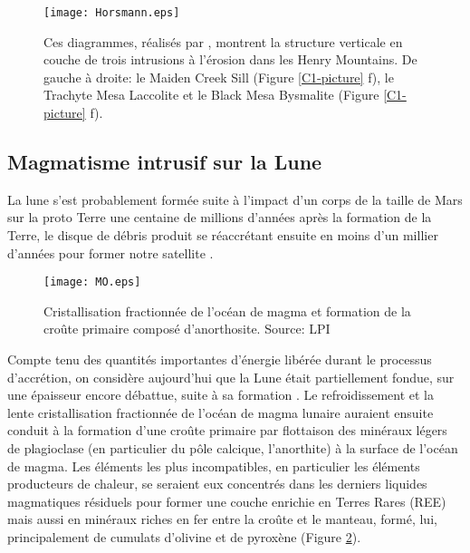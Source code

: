 \begin{figure}[htpb]
 \begin{center}
 \graphicspath{ {/Users/thorey/Documents/These/Manuscript/Figure/Chapter1/} }
 \texttt{[image: Horsmann.eps]}
 \caption{Ces diagrammes, réalisés par \citet{Horsman:2009gea},
 montrent la structure verticale en couche de trois intrusions à
 l'érosion dans les Henry Mountains. De gauche à droite: le
 Maiden Creek Sill (Figure \ref{C1-picture} f), le Trachyte Mesa
 Laccolite et le Black Mesa Bysmalite (Figure \ref{C1-picture}
 f).}
 \label{C1-Horsmann}
 \end{center}
\end{figure}

\subsection{Magmatisme intrusif sur la Lune}
\label{C1-sec:moon}

La lune s'est probablement formée suite à l'impact d'un corps de la
taille de Mars sur la proto Terre une centaine de millions d'années
après la formation de la Terre, le disque de débris produit se
réaccrétant ensuite en moins d'un millier d'années pour former notre
satellite
\citep{Mizutani:1972hc,Cameron:1991vu,Canup:2001eb,Canup:2012cd}.
\begin{figure}[h!]
 \begin{center}
 \graphicspath{ {/Users/thorey/Documents/These/Manuscript/Figure/Chapter1/} }
 \texttt{[image: MO.eps]}
 \caption{Cristallisation fractionnée de l'océan de magma et
 formation de la croûte primaire composé d'anorthosite. Source:
 LPI}
 \label{C1-MO}
 \end{center}
\end{figure}
Compte tenu des quantités importantes d'énergie libérée durant le
processus d'accrétion, on considère aujourd'hui que la Lune était
partiellement fondue, sur une épaisseur encore débattue, suite à sa
formation \citep{ElkinsTanton:2011ce}. Le refroidissement et la lente
cristallisation fractionnée de l'océan de magma lunaire auraient
ensuite conduit à la formation d'une croûte primaire par flottaison
des minéraux légers de plagioclase (en particulier du pôle calcique,
l'anorthite) à la surface de l'océan de magma. Les éléments les plus
incompatibles, en particulier les éléments producteurs de chaleur, se
seraient eux concentrés dans les derniers liquides magmatiques
résiduels pour former une couche enrichie en Terres Rares (REE) mais
aussi en minéraux riches en fer entre la croûte et le manteau, formé,
lui, principalement de cumulats d'olivine et de pyroxène (Figure
\ref{C1-MO}).

